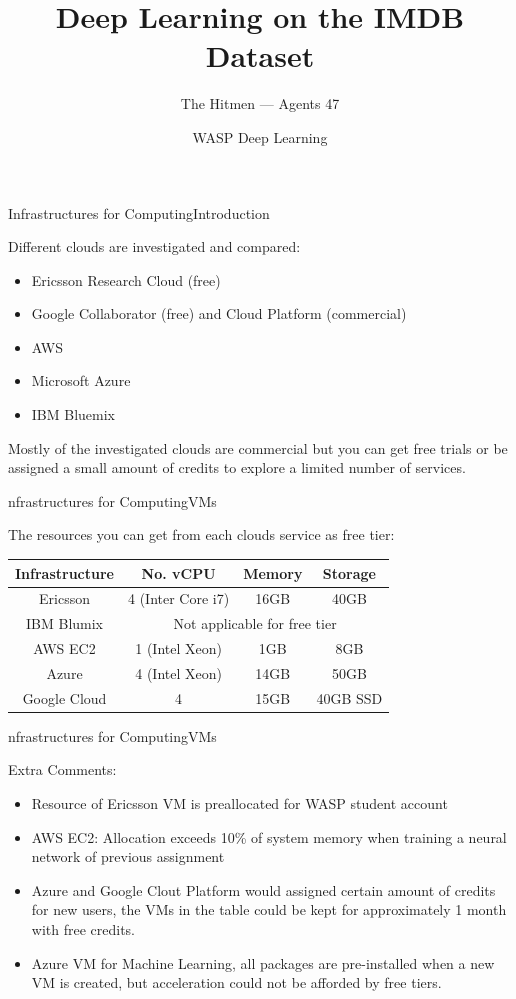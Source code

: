 \documentclass{beamer}
\title{Deep Learning on the IMDB Dataset}
\date{WASP Deep Learning}
\author[Agents 47]{The Hitmen --- Agents 47}
\begin{document}
\begin{frame}
  \titlepage
\end{frame}


\begin{frame}{Infrastructures for Computing}{Introduction}

Different clouds are investigated and compared:
\begin{itemize}
	\item Ericsson Research Cloud (free)
	\item Google Collaborator (free) and Cloud Platform (commercial)
	\item AWS
	\item Microsoft Azure
	\item IBM Bluemix 
\end{itemize}
Mostly of the investigated clouds are commercial  but you can get free trials or be assigned a small amount of credits to explore a limited number of services.   
\end{frame}

\begin{frame}{nfrastructures for Computing}{VMs }

The resources you can get from each clouds service as free tier:
\begin{table}[H]
	\begin{tabular}{|c|c|c|c|}
		\hline
		Infrastructure & No. vCPU&Memory&Storage\\
		\hline
		Ericsson & 4 (Inter Core i7) & 16GB & 40GB\\
		\hline
		IBM Blumix & \multicolumn{3}{c|}{Not applicable for free tier } \\
		\hline
		AWS EC2 & 1 (Intel Xeon)& 1GB& 8GB\\
		\hline
		Azure& 4 (Intel Xeon)& 14GB & 50GB \\
		\hline
		Google Cloud& 4 & 15GB & 40GB SSD\\
		\hline
	\end{tabular}
\end{table}


\end{frame}

\begin{frame}{nfrastructures for Computing}{VMs}

Extra Comments:
\begin{itemize}
	\item Resource of Ericsson VM is preallocated for WASP student account
	\item AWS EC2: Allocation exceeds 10\% of system memory when training a neural network of previous assignment 
	\item Azure and Google Clout Platform would assigned certain amount of credits for new users, the VMs in the table could be kept for approximately 1 month with free credits.
	\item Azure VM for Machine Learning, all packages are pre-installed when a new VM is created, but acceleration could not be afforded by free tiers. 
\end{itemize}

\end{frame}
\end{document}
